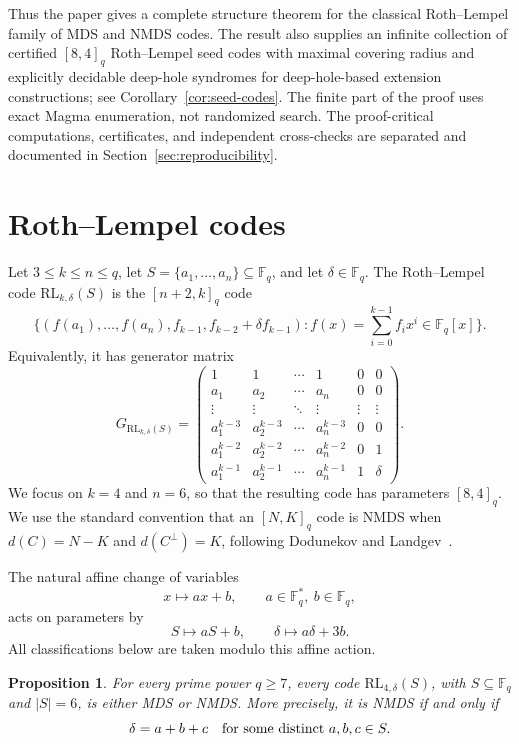 ﻿\documentclass[11pt]{article}
\newcommand{\F}{\mathbb F}
\newcommand{\RL}{\mathrm{RL}}
\theoremstyle{plain}
\newtheorem{proposition}[theorem]{Proposition}
\theoremstyle{definition}
\begin{document}
Thus the paper gives a complete structure theorem for the classical
Roth--Lempel family of MDS and NMDS codes.  The result also supplies an
infinite collection of certified \([8,4]_q\) Roth--Lempel seed codes with
maximal covering radius and
explicitly decidable deep-hole syndromes for deep-hole-based extension
constructions; see Corollary~\ref{cor:seed-codes}.  The finite part of the
proof uses exact Magma enumeration, not randomized search.  The
proof-critical computations, certificates, and independent cross-checks are
separated and documented in Section~\ref{sec:reproducibility}.

\section{Roth--Lempel codes}

Let \(3\leq k\leq n\leq q\), let \(S=\{a_1,\ldots,a_n\}\subseteq \F_q\), and
let \(\delta\in\F_q\).  The Roth--Lempel code
\(\RL_{k,\delta}(S)\) is the \([n+2,k]_q\) code
\[
  \bigl\{
    (f(a_1),\ldots,f(a_n),f_{k-1},f_{k-2}+\delta f_{k-1}):
    f(x)=\sum_{i=0}^{k-1} f_i x^i\in\F_q[x]
  \bigr\}.
\]
Equivalently, it has generator matrix
\[
  G_{\RL_{k,\delta}(S)}=
  \begin{pmatrix}
    1 & 1 & \cdots & 1 & 0 & 0\\
    a_1 & a_2 & \cdots & a_n & 0 & 0\\
    \vdots & \vdots & \ddots & \vdots & \vdots & \vdots\\
    a_1^{k-3} & a_2^{k-3} & \cdots & a_n^{k-3} & 0 & 0\\
    a_1^{k-2} & a_2^{k-2} & \cdots & a_n^{k-2} & 0 & 1\\
    a_1^{k-1} & a_2^{k-1} & \cdots & a_n^{k-1} & 1 & \delta
  \end{pmatrix}.
\]
We focus on \(k=4\) and \(n=6\), so that the resulting code has parameters
\([8,4]_q\).
We use the standard convention that an \([N,K]_q\) code is NMDS when
\(d(C)=N-K\) and \(d(C^\perp)=K\), following
Dodunekov and Landgev~\cite{DodunekovLandgev1995}.

The natural affine change of variables
\[
  x\mapsto ax+b,\qquad a\in\F_q^\ast,\ b\in\F_q,
\]
acts on parameters by
\[
  S\mapsto aS+b,\qquad \delta\mapsto a\delta+3b.
\]
All classifications below are taken modulo this affine action.

\begin{proposition}\label{prop:exhaustion}
For every prime power \(q\ge7\), every code
\(\RL_{4,\delta}(S)\), with \(S\subseteq\F_q\) and \(|S|=6\), is either MDS
or NMDS\@.  More precisely, it is NMDS if and only if
\[
 \delta=a+b+c\quad\hbox{for some distinct }a,b,c\in S.
\]
\end{proposition}
\end{document}
